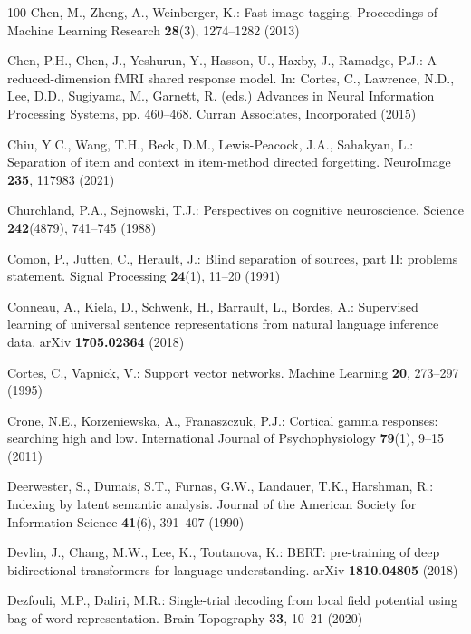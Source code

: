 \documentclass[runningheads]{llncs}
\begin{document}
\begin{thebibliography}{100}
Chen, M., Zheng, A., Weinberger, K.: Fast image tagging. Proceedings of Machine
  Learning Research  \textbf{28}(3),  1274--1282 (2013)

Chen, P.H., Chen, J., Yeshurun, Y., Hasson, U., Haxby, J., Ramadge, P.J.: A
  reduced-dimension {fMRI} shared response model. In: Cortes, C., Lawrence,
  N.D., Lee, D.D., Sugiyama, M., Garnett, R. (eds.) Advances in Neural
  Information Processing Systems, pp. 460--468. Curran Associates, Incorporated
  (2015)

Chiu, Y.C., Wang, T.H., Beck, D.M., Lewis-Peacock, J.A., Sahakyan, L.:
  Separation of item and context in item-method directed forgetting.
  {NeuroImage}  \textbf{235},  117983 (2021)

Churchland, P.A., Sejnowski, T.J.: Perspectives on cognitive neuroscience.
  Science  \textbf{242}(4879),  741--745 (1988)

Comon, P., Jutten, C., Herault, J.: Blind separation of sources, part {II}:
  problems statement. Signal Processing  \textbf{24}(1),  11--20 (1991)

Conneau, A., Kiela, D., Schwenk, H., Barrault, L., Bordes, A.: Supervised
  learning of universal sentence representations from natural language
  inference data. {arXiv}  \textbf{1705.02364} (2018)

Cortes, C., Vapnick, V.: Support vector networks. Machine Learning
  \textbf{20},  273--297 (1995)

Crone, N.E., Korzeniewska, A., Franaszczuk, P.J.: Cortical gamma responses:
  searching high and low. International Journal of Psychophysiology
  \textbf{79}(1),  9--15 (2011)

Deerwester, S., Dumais, S.T., Furnas, G.W., Landauer, T.K., Harshman, R.:
  Indexing by latent semantic analysis. Journal of the {American} Society for
  Information Science  \textbf{41}(6),  391--407 (1990)

Devlin, J., Chang, M.W., Lee, K., Toutanova, K.: {BERT}: pre-training of deep
  bidirectional transformers for language understanding. {arXiv}
  \textbf{1810.04805} (2018)

Dezfouli, M.P., Daliri, M.R.: Single-trial decoding from local field potential
  using bag of word representation. Brain Topography  \textbf{33},  10--21
  (2020)


\end{thebibliography}
\end{document}
